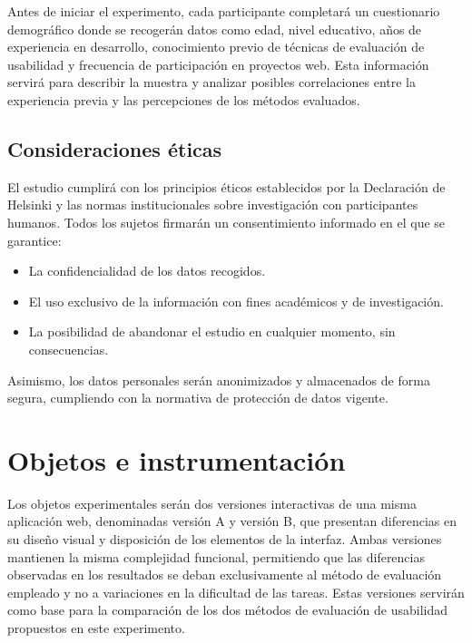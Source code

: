 \documentclass[a4paper,12pt]{report}
\begin{document}
Antes de iniciar el experimento, cada participante completará un cuestionario demográfico donde se recogerán datos como edad, nivel educativo, años de experiencia en desarrollo, conocimiento previo de técnicas de evaluación de usabilidad y frecuencia de participación en proyectos web. Esta información servirá para describir la muestra y analizar posibles correlaciones entre la experiencia previa y las percepciones de los métodos evaluados.

\subsection*{Consideraciones éticas}
El estudio cumplirá con los principios éticos establecidos por la Declaración de Helsinki y las normas institucionales sobre investigación con participantes humanos. Todos los sujetos firmarán un consentimiento informado en el que se garantice:
\begin{itemize}
    \item La confidencialidad de los datos recogidos.
    \item El uso exclusivo de la información con fines académicos y de investigación.
    \item La posibilidad de abandonar el estudio en cualquier momento, sin consecuencias.
\end{itemize}
Asimismo, los datos personales serán anonimizados y almacenados de forma segura, cumpliendo con la normativa de protección de datos vigente.

\section{Objetos e instrumentación}

Los objetos experimentales serán dos versiones interactivas de una misma aplicación web, denominadas versión A y versión B, que presentan diferencias en su diseño visual y 
disposición de los elementos de la interfaz. Ambas versiones mantienen la misma complejidad funcional, permitiendo que las diferencias observadas en los resultados se deban exclusivamente al método 
de evaluación empleado y no a variaciones en la dificultad de las tareas. Estas versiones servirán como base para la comparación de los dos métodos de evaluación de usabilidad propuestos en este experimento.
\end{document}
